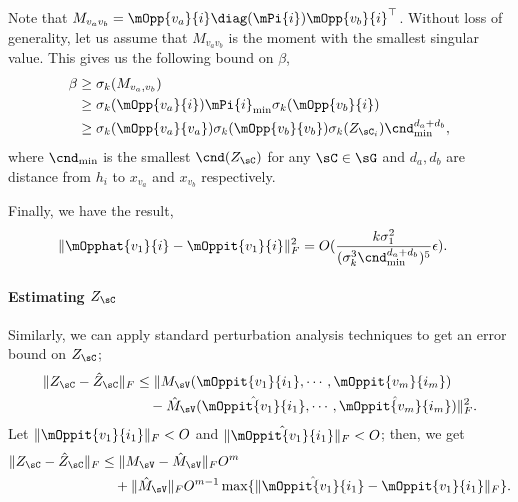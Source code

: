 Note that $M_{v_a v_b} = \mOpp{v_a}{i} \diag(\mPi{i})
\mOpp{v_b}{i}^\top$.
Without loss of generality, let us assume that $M_{v_a v_b}$ is the
  moment with the smallest singular value.
This gives us the following bound on $\beta$,
\begin{align*}
  \beta &\ge \sigma_k(M_{v_a,v_b}) \\
        &\ge \sigma_k(\mOpp{v_a}{i}) \mPi{i}_{\min} \sigma_k(\mOpp{v_b}{i}) \\
        &\ge \sigma_k(\mOpp{v_a}{v_a}) \sigma_k(\mOpp{v_b}{v_b}) \sigma_k(Z_{\sC_i}) \cnd_{\min}^{d_a + d_b},
\end{align*}
where $\cnd_{\min}$ is the smallest $\cnd(Z_\sC)$ for any $\sC \in \sG$
and $d_a, d_b$ are distance from $h_i$ to $x_{v_a}$ and $x_{v_b}$
respectively.

Finally, we have the result,
\begin{align*}
  \|\mOpphat{v_1}{i} - \mOppit{v_1}{i}\|^2_F 
    &= O( 
    \frac{k \sigma_1^2 }
    {(\sigma_k^3 \cnd_{\min}^{d_a + d_b})^5}
    \epsilon ). 
\end{align*}

\paragraph{Estimating $Z_\sC$}

Similarly, we can apply standard perturbation analysis techniques to get
an error bound on $Z_\sC$;
\begin{align*}
  \|Z_\sC - \hat Z_\sC\|_F 
  &\le \|M_\sV(\mOppit{v_1}{i_1}, \cdots, \mOppit{v_m}{i_m}) \\
      &\quad - \hat M_\sV(\hat{\mOppit{v_1}{i_1}}, \cdots, \hat{\mOppit{v_m}{i_m}})\|^2_F.
\end{align*}
Let $\|\mOppit{v_1}{i_1}\|_F < O$ and $\|\hat{\mOppit{v_1}{i_1}}\|_F < O$; then, we get
\begin{align*}
  \|Z_\sC - \hat Z_\sC\|_F 
  &\le \|M_\sV - \hat M_\sV\|_F O^m \\
  &\quad + \|\hat M_\sV\|_F O^{m-1} \max\{\|\hat {\mOppit{v_1}{i_1}} - \mOppit{v_1}{i_1}\|_F\}.
\end{align*}


